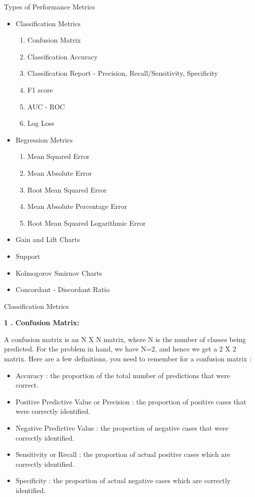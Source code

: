 \documentclass{beamer}
\newcommand\myheading[1]{%
  \par\bigskip
  {\large\bfseries#1}\par\smallskip}
\begin{document}
\begin{frame}{Types of Performance Metrics}
	\begin{flushleft}
		\begin{itemize}
			\item Classification Metrics
			\begin{enumerate}
				\item Confusion Matrix
				\item Classification Accuracy
				\item Classification Report - Precision, Recall/Sensitivity, Specificity
				\item F1 score
				\item AUC - ROC
				\item Log Loss
			\end{enumerate}
			\item Regression Metrics
			\begin {enumerate}
				\item Mean Squared Error
				\item Mean Absolute Error
				\item Root Mean Squared Error
				\item Mean Absolute Percentage Error
				\item Root Mean Squared Logarithmic Error
			\end{enumerate}
			\item Gain and Lift Charts
			\item Support
			\item Kolmogorov Smirnov Charts
			\item Concordant - Discordant Ratio
		\end{itemize}
	\end{flushleft}
\end{frame}

\begin{frame}{Classification Metrics}
\begin{flushleft}
	\myheading {1 . Confusion Matrix:}
	A confusion matrix is an N X N matrix, where N is the number of classes being predicted. For the problem in hand, we have N=2, and hence we get a 2 X 2 matrix. Here are a few definitions, you need to remember for a confusion matrix :
	\begin{itemize}
		\item Accuracy : the proportion of the total number of predictions that were correct.
		\item Positive Predictive Value or Precision : the proportion of positive cases that were correctly identified.
		\item Negative Predictive Value : the proportion of negative cases that were correctly identified.
		\item Sensitivity or Recall : the proportion of actual positive cases which are correctly identified.
		\item Specificity : the proportion of actual negative cases which are correctly identified.
	\end{itemize}
\end{flushleft}
\end{frame}
\end{document}
